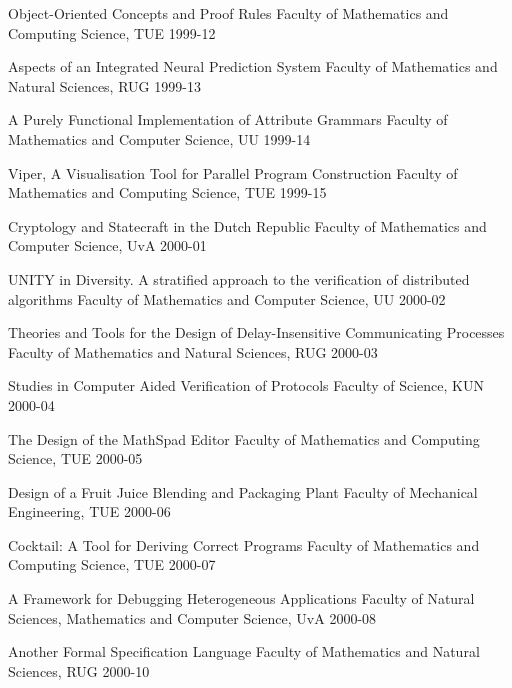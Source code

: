 \begin{multicols}{2}
         {Object-Oriented Concepts and Proof Rules}
         {Faculty of Mathematics and Computing Science, TUE}
         {1999-12}

         {Aspects of an Integrated Neural Prediction System}
         {Faculty of Mathematics and Natural Sciences, RUG}
         {1999-13}

         {A Purely Functional Implementation of Attribute Grammars}
         {Faculty of Mathematics and Computer Science, UU}
         {1999-14}

         {Viper, A Visualisation Tool for Parallel Program 
Construction}
         {Faculty of Mathematics and Computing Science, TUE}
         {1999-15}

         {Cryptology and Statecraft in the Dutch Republic}
         {Faculty of Mathematics and Computer Science, UvA}
         {2000-01}

         {UNITY in Diversity. A stratified approach to the 
         verification of distributed algorithms}
         {Faculty of Mathematics and Computer Science, UU}
         {2000-02}

         {Theories and Tools for the Design of Delay-Insensitive 
         Communicating Processes}
         {Faculty of Mathematics and Natural Sciences, RUG}
         {2000-03}

         {Studies in Computer Aided Verification of Protocols}
         {Faculty of Science, KUN}
         {2000-04}

         {The Design of the MathSpad Editor}
         {Faculty of Mathematics and Computing Science, TUE}
         {2000-05}

         {Design of a Fruit Juice Blending and Packaging Plant}
         {Faculty of Mechanical Engineering, TUE}
         {2000-06}

         {Cocktail: A Tool for Deriving Correct Programs}
         {Faculty of Mathematics and Computing Science, TUE}
         {2000-07}

         {A Framework for Debugging Heterogeneous Applications}
         {Faculty of Natural Sciences, Mathematics and Computer 
Science,           UvA}
         {2000-08}

         {Another Formal Specification Language}
         {Faculty of Mathematics and Natural Sciences, RUG}
         {2000-10}


\end{multicols}
